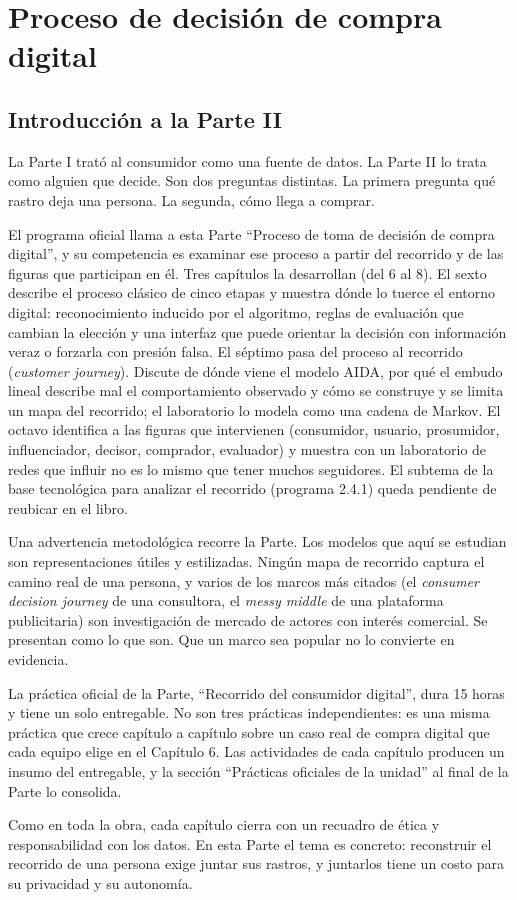 \part{Proceso de decisión de compra digital}

\chapter*{Introducción a la Parte II}

La Parte I trató al consumidor como una fuente de datos. La Parte II lo trata
como alguien que decide. Son dos preguntas distintas. La primera pregunta qué
rastro deja una persona. La segunda, cómo llega a comprar.

El programa oficial llama a esta Parte \enquote{Proceso de toma de decisión
de compra digital}, y su competencia es examinar ese proceso a partir del
recorrido y de las figuras que participan en él. Tres capítulos la
desarrollan (del 6 al 8). El sexto describe el proceso clásico de cinco etapas y muestra
dónde lo tuerce el entorno digital: reconocimiento inducido por el
algoritmo, reglas de evaluación que cambian la elección y una interfaz que
puede orientar la decisión con información veraz o forzarla con presión
falsa. El séptimo pasa del proceso al recorrido (\textit{customer journey}).
Discute de dónde viene el modelo AIDA, por qué el embudo lineal describe mal
el comportamiento observado y cómo se construye y se limita un mapa del
recorrido; el laboratorio lo modela como una cadena de Markov. El octavo
identifica a las figuras que intervienen (consumidor, usuario, prosumidor,
influenciador, decisor, comprador, evaluador) y muestra con un laboratorio de
redes que influir no es lo mismo que tener muchos seguidores. El subtema
de la base tecnológica para analizar el recorrido (programa 2.4.1) queda
pendiente de reubicar en el libro.

Una advertencia metodológica recorre la Parte. Los modelos que aquí se
estudian son representaciones útiles y estilizadas. Ningún mapa de recorrido
captura el camino real de una persona, y varios de los marcos más citados
(el \textit{consumer decision journey} de una consultora, el \textit{messy
middle} de una plataforma publicitaria) son investigación de mercado de
actores con interés comercial. Se presentan como lo que son. Que un marco sea
popular no lo convierte en evidencia.

La práctica oficial de la Parte, \enquote{Recorrido del consumidor digital},
dura 15 horas y tiene un solo entregable. No son tres prácticas
independientes: es una misma práctica que crece capítulo a capítulo sobre un
caso real de compra digital que cada equipo elige en el Capítulo 6. Las
actividades de cada capítulo producen un insumo del entregable, y la sección
\enquote{Prácticas oficiales de la unidad} al final de la Parte lo consolida.

Como en toda la obra, cada capítulo cierra con un recuadro de ética y
responsabilidad con los datos. En esta Parte el tema es concreto: reconstruir
el recorrido de una persona exige juntar sus rastros, y juntarlos tiene un
costo para su privacidad y su autonomía.
